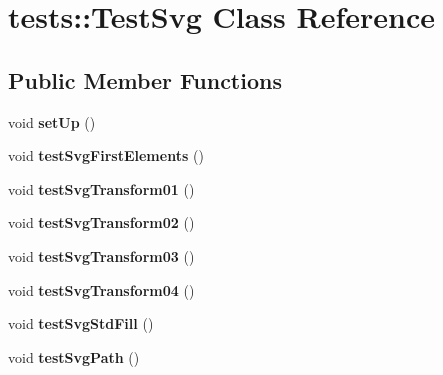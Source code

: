 \hypertarget{classtests_1_1_test_svg}{
\section{tests::TestSvg Class Reference}
\label{classtests_1_1_test_svg}
}
\subsection*{Public Member Functions}
\begin{DoxyCompactItemize}
\item 
\hypertarget{classtests_1_1_test_svg_a39006df874d535ed8c71c90842fa106f}{
void {\bfseries setUp} ()}
\label{classtests_1_1_test_svg_a39006df874d535ed8c71c90842fa106f}

\item 
\hypertarget{classtests_1_1_test_svg_a1c9e8bd062c6b184d99e3c5e0fcc3692}{
void {\bfseries testSvgFirstElements} ()}
\label{classtests_1_1_test_svg_a1c9e8bd062c6b184d99e3c5e0fcc3692}

\item 
\hypertarget{classtests_1_1_test_svg_a3e18b891a9302e5636ee60a37304f229}{
void {\bfseries testSvgTransform01} ()}
\label{classtests_1_1_test_svg_a3e18b891a9302e5636ee60a37304f229}

\item 
\hypertarget{classtests_1_1_test_svg_ad2ef026ac311a61f461613075eef958a}{
void {\bfseries testSvgTransform02} ()}
\label{classtests_1_1_test_svg_ad2ef026ac311a61f461613075eef958a}

\item 
\hypertarget{classtests_1_1_test_svg_a8e356a98426cece3d06f8a6ce39a9400}{
void {\bfseries testSvgTransform03} ()}
\label{classtests_1_1_test_svg_a8e356a98426cece3d06f8a6ce39a9400}

\item 
\hypertarget{classtests_1_1_test_svg_abaf7b2d2ccb0eb9419bc04afbb6dca25}{
void {\bfseries testSvgTransform04} ()}
\label{classtests_1_1_test_svg_abaf7b2d2ccb0eb9419bc04afbb6dca25}

\item 
\hypertarget{classtests_1_1_test_svg_a588b53a8bcf2b92b8656cf95d942c2f5}{
void {\bfseries testSvgStdFill} ()}
\label{classtests_1_1_test_svg_a588b53a8bcf2b92b8656cf95d942c2f5}

\item 
\hypertarget{classtests_1_1_test_svg_a7ea7f4b80c8b17f993b0d6fcf41b753e}{
void {\bfseries testSvgPath} ()}
\label{classtests_1_1_test_svg_a7ea7f4b80c8b17f993b0d6fcf41b753e}


\end{DoxyCompactItemize}
